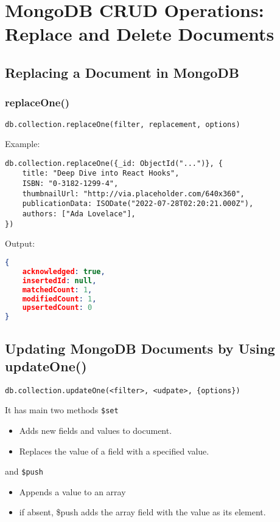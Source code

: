 \documentclass[../main.tex]{subfiles}
\begin{document}
\chapter{MongoDB CRUD Operations: Replace and Delete Documents}
\section{Replacing a Document in MongoDB}
\subsection{replaceOne()}
\begin{lstlisting}[language=MongoDB, caption=replaceOne method syntax]
db.collection.replaceOne(filter, replacement, options)
\end{lstlisting}
Example: 
\begin{lstlisting}[language=MongoDB, caption=replaceOne example]
db.collection.replaceOne({_id: ObjectId("...")}, {
	title: "Deep Dive into React Hooks",
	ISBN: "0-3182-1299-4", 
	thumbnailUrl: "http://via.placeholder.com/640x360", 
	publicationData: ISODate("2022-07-28T02:20:21.000Z"),
	authors: ["Ada Lovelace"],
})
\end{lstlisting}

Output: 
\begin{lstlisting}[language=JSON, caption=replaceOne example output]
{
	acknowledged: true, 
	insertedId: null, 
	matchedCount: 1, 
	modifiedCount: 1, 
	upsertedCount: 0
}
\end{lstlisting}
\section{Updating MongoDB Documents by Using updateOne()}

\begin{lstlisting}[language=MongoDB, caption=updateOne method syntax]
db.collection.updateOne(<filter>, <udpate>, {options})
\end{lstlisting}

It has main two methods \lstinline{$set}
\begin{itemize}
	\item Adds new fields and values to document.
	\item Replaces the value of a field with a specified value.
\end{itemize}
and \lstinline{$push}
\begin{itemize}
	\item Appends a value to an array 
	\item if absent, \$push adds the array field with the value as its element.
\end{itemize}
\end{document}
